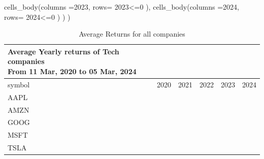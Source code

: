 \documentclass[
  12pt]{article}
\newenvironment{Shaded}{\begin{snugshade}}{\end{snugshade}}
\newcommand{\AttributeTok}[1]{\textcolor[rgb]{0.40,0.45,0.13}{#1}}
\newcommand{\DecValTok}[1]{\textcolor[rgb]{0.68,0.00,0.00}{#1}}
\newcommand{\FunctionTok}[1]{\textcolor[rgb]{0.28,0.35,0.67}{#1}}
\newcommand{\NormalTok}[1]{\textcolor[rgb]{0.00,0.23,0.31}{#1}}
\newcommand{\SpecialCharTok}[1]{\textcolor[rgb]{0.37,0.37,0.37}{#1}}
\newcommand{\StringTok}[1]{\textcolor[rgb]{0.13,0.47,0.30}{#1}}
\theoremstyle{definition}
\theoremstyle{remark}
\begin{document}
\begin{Shaded}
\begin{Highlighting}[]
       \FunctionTok{cells\_body}\NormalTok{(}\AttributeTok{columns =}\StringTok{\textasciigrave{}}\AttributeTok{2023}\StringTok{\textasciigrave{}}\NormalTok{, }
                 \AttributeTok{rows=} \StringTok{\textasciigrave{}}\AttributeTok{2023}\StringTok{\textasciigrave{}}\SpecialCharTok{\textless{}=}\DecValTok{0}\NormalTok{ ), }
      \FunctionTok{cells\_body}\NormalTok{(}\AttributeTok{columns =}\StringTok{\textasciigrave{}}\AttributeTok{2024}\StringTok{\textasciigrave{}}\NormalTok{, }
                 \AttributeTok{rows=} \StringTok{\textasciigrave{}}\AttributeTok{2024}\StringTok{\textasciigrave{}}\SpecialCharTok{\textless{}=}\DecValTok{0}\NormalTok{ )}
\NormalTok{    )}
\NormalTok{  )}
\end{Highlighting}
\end{Shaded}

\begin{longtable}{lrrrrr}

\caption{\label{tbl-average-returns-all-companies}Average Returns for
all companies}

\tabularnewline

\caption*{
{\large Average Yearly returns of Tech companies} \\ 
{\small From 11 Mar, 2020 to 05 Mar, 2024}
} \\ 
\toprule
symbol & 2020 & 2021 & 2022 & 2023 & 2024 \\ 
\midrule\addlinespace[2.5pt]
AAPL & \cellcolor[HTML]{90EE90}{\textcolor[HTML]{FFFFFF}{$0.0037$}} & \cellcolor[HTML]{90EE90}{\textcolor[HTML]{FFFFFF}{$0.0012$}} & \cellcolor[HTML]{FF0000}{\textcolor[HTML]{FFFFFF}{$-0.0012$}} & \cellcolor[HTML]{90EE90}{\textcolor[HTML]{FFFFFF}{$0.0016$}} & \cellcolor[HTML]{FF0000}{\textcolor[HTML]{FFFFFF}{$-0.0022$}} \\ 
AMZN & \cellcolor[HTML]{90EE90}{\textcolor[HTML]{FFFFFF}{$0.0033$}} & \cellcolor[HTML]{90EE90}{\textcolor[HTML]{FFFFFF}{$0.0001$}} & \cellcolor[HTML]{FF0000}{\textcolor[HTML]{FFFFFF}{$-0.0027$}} & \cellcolor[HTML]{90EE90}{\textcolor[HTML]{FFFFFF}{$0.0024$}} & \cellcolor[HTML]{90EE90}{\textcolor[HTML]{FFFFFF}{$0.0036$}} \\ 
GOOG & \cellcolor[HTML]{90EE90}{\textcolor[HTML]{FFFFFF}{$0.0022$}} & \cellcolor[HTML]{90EE90}{\textcolor[HTML]{FFFFFF}{$0.0020$}} & \cellcolor[HTML]{FF0000}{\textcolor[HTML]{FFFFFF}{$-0.0019$}} & \cellcolor[HTML]{90EE90}{\textcolor[HTML]{FFFFFF}{$0.0019$}} & \cellcolor[HTML]{FF0000}{\textcolor[HTML]{FFFFFF}{$-0.0011$}} \\ 
MSFT & \cellcolor[HTML]{90EE90}{\textcolor[HTML]{FFFFFF}{$0.0023$}} & \cellcolor[HTML]{90EE90}{\textcolor[HTML]{FFFFFF}{$0.0016$}} & \cellcolor[HTML]{FF0000}{\textcolor[HTML]{FFFFFF}{$-0.0013$}} & \cellcolor[HTML]{90EE90}{\textcolor[HTML]{FFFFFF}{$0.0018$}} & \cellcolor[HTML]{90EE90}{\textcolor[HTML]{FFFFFF}{$0.0023$}} \\ 
TSLA & \cellcolor[HTML]{90EE90}{\textcolor[HTML]{FFFFFF}{$0.0090$}} & \cellcolor[HTML]{90EE90}{\textcolor[HTML]{FFFFFF}{$0.0016$}} & \cellcolor[HTML]{FF0000}{\textcolor[HTML]{FFFFFF}{$-0.0042$}} & \cellcolor[HTML]{90EE90}{\textcolor[HTML]{FFFFFF}{$0.0028$}} & \cellcolor[HTML]{FF0000}{\textcolor[HTML]{FFFFFF}{$-0.0065$}} \\ 
\bottomrule


\end{longtable}
\end{document}
